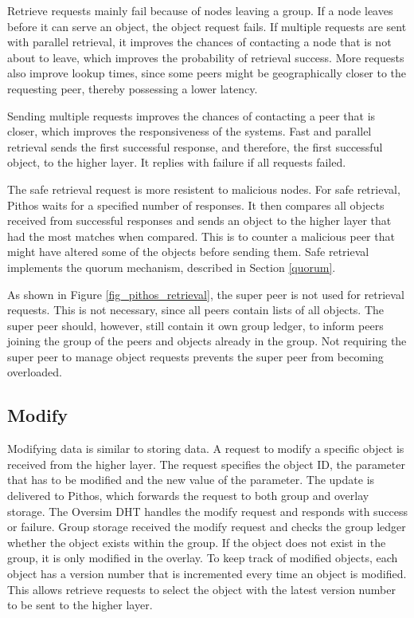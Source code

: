 Retrieve requests mainly fail because of nodes leaving a group. If a node leaves before it can serve an object, the object request fails. If multiple requests are sent with parallel retrieval, it improves the chances of contacting a node that is not about to leave, which improves the probability of retrieval success. More requests also improve lookup times, since some peers might be geographically closer to the requesting peer, thereby possessing a lower latency.

Sending multiple requests improves the chances of contacting a peer that is closer, which improves the responsiveness of the systems. Fast and parallel retrieval sends the first successful  response, and therefore, the first successful object, to the higher layer. It replies with failure if all requests failed.

The safe retrieval request is more resistent to malicious nodes. For safe retrieval, Pithos waits for a specified number of responses. It then compares all objects received from successful responses and sends an object to the higher layer that had the most matches when compared. This is to counter a malicious peer that might have altered some of the objects before sending them. Safe retrieval implements the quorum mechanism, described in Section \ref{quorum}.

As shown in Figure \ref{fig_pithos_retrieval}, the super peer is not used for retrieval requests. This is not necessary, since all peers contain lists of all objects. The super peer should, however, still contain it own group ledger, to inform peers joining the group of the peers and objects already in the group. Not requiring the super peer to manage object requests prevents the super peer from becoming overloaded.

\subsection{Modify}

Modifying data is similar to storing data. A request to modify a specific object is received from the higher layer. The request specifies the object ID, the parameter that has to be modified and the new value of the parameter. The update is delivered to Pithos, which forwards the request to both group and overlay storage. The Oversim DHT handles the modify request and responds with success or failure. Group storage received the modify request and checks the group ledger whether the object exists within the group. If the object does not exist in the group, it is only modified in the overlay. To keep track of modified objects, each object has a version number that is incremented every time an object is modified. This allows retrieve requests to select the object with the latest version number to be sent to the higher layer.

